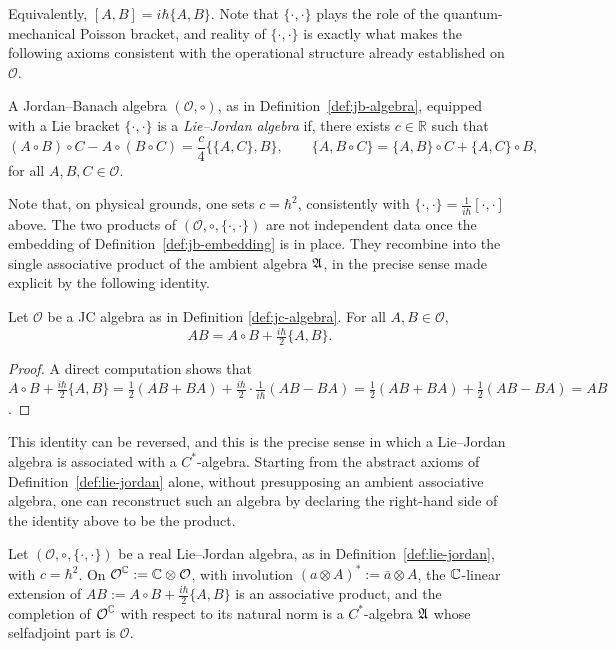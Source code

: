 Equivalently, $[A,B]=i\hbar\{A,B\}$. Note that $\{\cdot,\cdot\}$ plays the role of the
quantum-mechanical Poisson bracket, and reality of $\{\cdot,\cdot\}$ is
exactly what makes the following axioms consistent with the operational
structure already established on $\mathcal{O}$.

\begin{definition}\label{def:lie-jordan}
	A Jordan--Banach algebra $(\mathcal{O},\circ)$, as in
	Definition~\ref{def:jb-algebra}, equipped with a Lie bracket
	$\{\cdot,\cdot\}$ is a \emph{Lie--Jordan algebra} if, there exists
	$c\in\mathbb{R}$ such that
	\[
	(A\circ B)\circ C-A\circ(B\circ C)=\frac{c}{4}\{\{A,C\},B\}, \qquad
	\{A,B\circ C\}=\{A,B\}\circ C+\{A,C\}\circ B,
	\]
	for all $A,B,C\in\mathcal{O}$.
\end{definition}

Note that, on physical grounds, one sets $c=\hbar^2$,
consistently with $\{\cdot,\cdot\}=\tfrac{1}{i\hbar}[\cdot,\cdot]$ above. The two products of $(\mathcal{O},\circ,\{\cdot,\cdot\})$ are not independent data once the embedding of Definition~\ref{def:jb-embedding} is in place. They recombine into the single associative product of the ambient algebra $\mathfrak{A}$, in the precise sense made explicit by the following identity.

\begin{proposition}
	Let $\mathcal{O}$ be a JC algebra as in Definition \ref{def:jc-algebra}. For all $A,B\in\mathcal{O}$,
	\begin{equation}
		AB=A\circ B+\tfrac{i\hbar}{2}\{A,B\}. \label{eq:jordan-ass-product}
	\end{equation}
\end{proposition}
\begin{proof}
	A direct computation shows that $A\circ B+\tfrac{i\hbar}{2}\{A,B\}
	=\tfrac12(AB+BA)+\tfrac{i\hbar}{2}\cdot\tfrac{1}{i\hbar}(AB-BA)
	=\tfrac12(AB+BA)+\tfrac12(AB-BA)=AB$.
\end{proof}

This identity can be reversed, and this is the precise sense in which a
Lie--Jordan algebra is associated with a $C^*$-algebra. Starting from the
abstract axioms of Definition~\ref{def:lie-jordan} alone, without
presupposing an ambient associative algebra, one can reconstruct such an
algebra by declaring the right-hand side of the identity above to be the
product.

\begin{theorem}
	\label{thm:lie-jordan-to-cstar}
	Let $(\mathcal{O},\circ,\{\cdot,\cdot\})$ be a real Lie--Jordan algebra, as
	in Definition~\ref{def:lie-jordan}, with $c=\hbar^2$. On
	$\mathcal{O}^{\C}:=\C\otimes\mathcal{O}$, with involution
	$(a\otimes A)^*:=\bar a\otimes A$, the $\mathbb{C}$-linear extension of
	$AB:=A\circ B+\tfrac{i\hbar}{2}\{A,B\}$ is an associative product, and the
	completion of $\mathcal{O}^{\C}$ with respect to its natural norm
	is a $C^*$-algebra $\mathfrak{A}$ whose selfadjoint part is $\mathcal{O}$.
\end{theorem}

